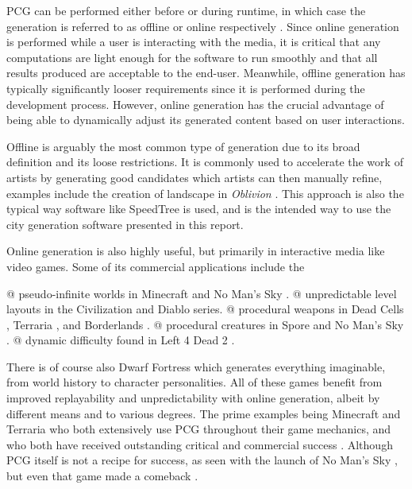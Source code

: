 PCG can be performed either before or during runtime, in which case the generation is referred to as offline or online respectively \cite[p. 7-8]{pcg_in_games}.
Since online generation is performed while a user is interacting with the media, it is critical that any computations are light enough for the software to run smoothly and that all results produced are acceptable to the end-user.
Meanwhile, offline generation has typically significantly looser requirements since it is performed during the development process.
However, online generation has the crucial advantage of being able to dynamically adjust its generated content based on user interactions.

Offline is arguably the most common type of generation due to its broad definition and its loose restrictions.
It is commonly used to accelerate the work of artists by generating good candidates which artists can then manually refine, examples include the creation of landscape in \textit{Oblivion} \cite{elder_scrolls_iv}.
This approach is also the typical way software like SpeedTree \cite{speedtree} is used, and is the intended way to use the city generation software presented in this report.

Online generation is also highly useful, but primarily in interactive media like video games.
Some of its commercial applications include the
\begin{easylist}
  @ pseudo-infinite worlds in Minecraft \cite{minecraft} and No Man's Sky \cite{no_man_sky}.
  @ unpredictable level layouts in the Civilization \cite{civilization} and Diablo \cite{diablo} series.
  @ procedural weapons in Dead Cells \cite{dead_cells}, Terraria \cite{terraria}, and Borderlands \cite{borderlands}.
  @ procedural creatures in Spore \cite{spore} and No Man's Sky \cite{no_man_sky}.
  @ dynamic difficulty found in Left 4 Dead 2 \cite{left_4_dead_2}.
\end{easylist}
There is of course also Dwarf Fortress \cite{dwarf_fortress} which generates everything imaginable, from world history to character personalities.
All of these games benefit from improved replayability and unpredictability with online generation, albeit by different means and to various degrees.
The prime examples being Minecraft and Terraria who both extensively use PCG throughout their game mechanics, and who both have received outstanding critical and commercial success \cite{minecraft_reviews} \cite{minecraft_commercial} \cite{terraria_reviews} \cite{terraria_commercial}.
Although PCG itself is not a recipe for success, as seen with the launch of No Man's Sky \cite{no_man_sky_launch}, but even that game made a comeback \cite{no_man_sky_comeback}.


